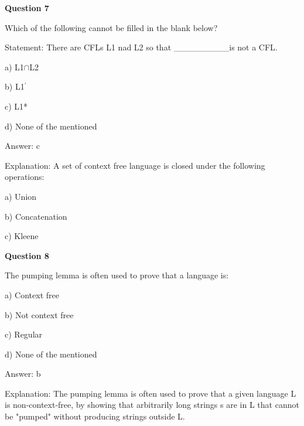 \documentclass{article}
\begin{document}
\begin{mdframed}[linewidth=1pt, roundcorner=5pt, linecolor=gray!30, backgroundcolor=gray!5]
\textbf{Question 7} 

Which of the following cannot be filled in the blank below?

Statement: There are CFLs L1 nad L2 so that \_\_\_\_\_\_\_\_\_is not a CFL.

a) L1$\cap$L2

b) L1$^\prime$

c) L1*

d) None of the mentioned
\vspace{5pt} \par
\begin{tcolorbox}[colback=green!5, colframe=green!40!black, title=Solution]
Answer: c

Explanation: A set of context free language is closed under the following operations:

a) Union

b) Concatenation

c) Kleene
\end{tcolorbox}
\end{mdframed}

\begin{mdframed}[linewidth=1pt, roundcorner=5pt, linecolor=gray!30, backgroundcolor=gray!5]
\textbf{Question 8} 

The pumping lemma is often used to prove that a language is:

a) Context free

b) Not context free

c) Regular

d) None of the mentioned
\vspace{5pt} \par
\begin{tcolorbox}[colback=green!5, colframe=green!40!black, title=Solution]
Answer: b

Explanation: The pumping lemma is often used to prove that a given language L is non-context-free, by showing that arbitrarily long strings s are in L that cannot be "pumped" without producing strings outside L.
\end{tcolorbox}
\end{mdframed}
\end{document}
